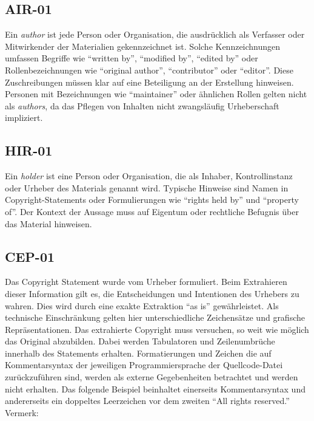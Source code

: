 
\subsection{AIR-01}\label{subsec:air-01}

Ein \textit{author} ist jede Person oder Organisation, die ausdrücklich als Verfasser oder Mitwirkender der Materialien gekennzeichnet ist.
Solche Kennzeichnungen umfassen Begriffe wie \enquote{written by}, \enquote{modified by}, \enquote{edited by} oder Rollenbezeichnungen wie \enquote{original author}, \enquote{contributor} oder \enquote{editor}.
Diese Zuschreibungen müssen klar auf eine Beteiligung an der Erstellung hinweisen.
Personen mit Bezeichnungen wie \enquote{maintainer} oder ähnlichen Rollen gelten nicht als \textit{authors}, da das Pflegen von Inhalten nicht zwangsläufig Urheberschaft impliziert.


\subsection{HIR-01}\label{subsec:hir-01}

Ein \textit{holder} ist eine Person oder Organisation, die als Inhaber, Kontrollinstanz oder Urheber des Materials genannt wird.
Typische Hinweise sind Namen in Copyright-Statements oder Formulierungen wie \enquote{rights held by} und \enquote{property of}.
Der Kontext der Aussage muss auf Eigentum oder rechtliche Befugnis über das Material hinweisen.


\subsection{CEP-01}\label{subsec:cep-01}

Das Copyright Statement wurde vom Urheber formuliert.
Beim Extrahieren dieser Information gilt es, die Entscheidungen und Intentionen des Urhebers zu wahren.
Dies wird durch eine exakte Extraktion \enquote{as is} gewährleistet.
Als technische Einschränkung gelten hier unterschiedliche Zeichensätze und grafische Repräsentationen.
Das extrahierte Copyright muss versuchen, so weit wie möglich das Original abzubilden.
Dabei werden Tabulatoren und Zeilenumbrüche innerhalb des Statements erhalten.
Formatierungen und Zeichen die auf Kommentarsyntax der jeweiligen Programmiersprache der Quellcode-Datei zurückzuführen sind, werden als externe Gegebenheiten betrachtet und werden nicht erhalten.
Das folgende Beispiel beinhaltet einerseits Kommentarsyntax und andererseits ein doppeltes Leerzeichen vor dem zweiten \enquote{All rights reserved.} Vermerk:

